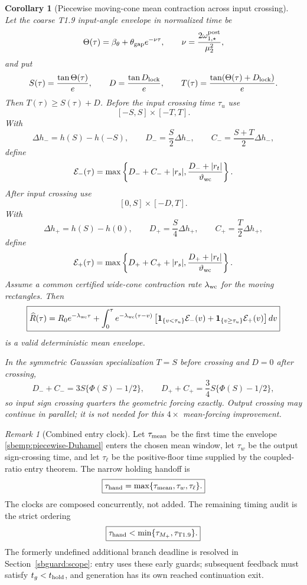 \documentclass{article} %
\theoremstyle{plain}
\newtheorem{corollary}[theorem]{Corollary}
\theoremstyle{definition}
\theoremstyle{remark}
\newtheorem{remark}[theorem]{Remark}
\begin{document}
\begin{corollary}[Piecewise moving-cone mean contraction across input crossing]
\label{sbemp:piecewise-wide-mean}
Let the coarse T1.9 input-angle envelope in normalized time be
\[
 \Theta(\tau)=\beta_\theta+\theta_{\rm gap}e^{-\nu\tau},
 \qquad \nu=\frac{2\omega_{1,\star}^{\rm post}}{\mu_2^2},
\]
and put
\[
 S(\tau)=\frac{\tan\Theta(\tau)}e,\qquad
 D=\frac{\tan D_{\rm lock}}e,\qquad
 T(\tau)=\frac{\tan(\Theta(\tau)+D_{\rm lock})}{e}.
\]
Then $T(\tau)\ge S(\tau)+D$.  Before the input crossing time $\tau_u$ use
\[
 [-S,S]\times[-T,T].
\]
With
\[
 \Delta h_-=h(S)-h(-S),\qquad
 D_-=\frac{S}{2}\Delta h_-,\qquad
 C_-=\frac{S+T}{2}\Delta h_-,
\]
define
\[
 \mathcal E_-(\tau)
 =\max\left\{D_-+C_-+|r_s|,
 \frac{D_-+|r_t|}{\vartheta_{\rm wc}}\right\}.
\]
After input crossing use
\[
 [0,S]\times[-D,T].
\]
With
\[
 \Delta h_+=h(S)-h(0),\qquad
 D_+=\frac{S}{4}\Delta h_+,\qquad
 C_+=\frac{T}{2}\Delta h_+,
\]
define
\[
 \mathcal E_+(\tau)
 =\max\left\{D_++C_++|r_s|,
 \frac{D_++|r_t|}{\vartheta_{\rm wc}}\right\}.
\]
Assume a common certified wide-cone contraction rate $\lambda_{\rm wc}$
for the moving rectangles.  Then
\begin{equation}\label{sbemp:piecewise-Duhamel}
 \boxed{
 \widehat R(\tau)
 =R_0e^{-\lambda_{\rm wc}\tau}
 +\int_0^\tau e^{-\lambda_{\rm wc}(\tau-v)}
 \left[\mathbf1_{\{v<\tau_u\}}\mathcal E_-(v)
 +\mathbf1_{\{v\ge\tau_u\}}\mathcal E_+(v)\right]dv
 }
\end{equation}
is a valid deterministic mean envelope.

In the symmetric Gaussian specialization $T=S$ before crossing and
$D=0$ after crossing,
\[
 D_-+C_-=3S\{\Phi(S)-1/2\},
 \qquad
 D_++C_+=\frac34S\{\Phi(S)-1/2\},
\]
so input sign crossing quarters the geometric forcing exactly.  Output
crossing may continue in parallel; it is not needed for this $4\times$
mean-forcing improvement.
\end{corollary}

\begin{remark}[Combined entry clock]
\label{sbemp:combined-clock}
Let $\tau_{\rm mean}$ be the first time the envelope
\eqref{sbemp:piecewise-Duhamel} enters the chosen mean window, let
$\tau_w$ be the output sign-crossing time, and let $\tau_\ell$ be the
positive-floor time supplied by the coupled-ratio entry theorem.  The narrow
holding handoff is
\[
 \boxed{\tau_{\rm hand}=\max\{\tau_{\rm mean},\tau_w,\tau_\ell\}.}
\]
The clocks are composed concurrently, not added.  The remaining timing
audit is the strict ordering
\[
 \boxed{
 \tau_{\rm hand}
 <\min\{\tau_{M_+},\tau_{\rm T1.9}\}.
 }
\]
The formerly undefined additional branch deadline is resolved in
Section~\ref{sbguard:scope}: entry uses these early guards; subsequent
feedback must satisfy $t_g<t_{\rm hold}$, and generation has its own
reached continuation exit.
\end{remark}
\end{document}
